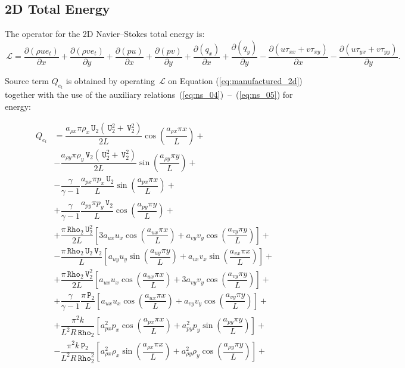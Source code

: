 \documentclass[10pt]{article}
\newcommand{\Diff}[2] {\dfrac{\partial( #1)}{\partial #2}}
\newcommand{\Rho}{\,\mathtt{Rho}}
\newcommand{\PP}{\,\mathtt{P}}
\newcommand{\U}{\,\mathtt{U}}
\newcommand{\V}{\,\mathtt{V}}
\newcommand{\Lo}{\,\mathcal{L}}
\begin{document}
\subsection{2D Total Energy}

The operator for the 2D Navier--Stokes total energy is:
\begin{equation*}
 \Lo=  \Diff{\rho ue_t }{x}+\Diff{\rho ve_t}{y}+\Diff{pu}{x} +\Diff{pv}{y}+\Diff{q_x}{x}+\Diff{q_y}{y}-\Diff{u\tau_{xx}+v\tau_{xy}}{x}-\Diff{u\tau_{yx}+v\tau_{yy}}{y}.
\end{equation*}


Source term $Q_{e_t}$ is obtained by operating $\Lo$ on Equation  (\ref{eq:manufactured_2d}) together with the use of the  auxiliary relations~(\ref{eq:ns_04})~--~(\ref{eq:ns_05}) for energy:

\begin{equation}
 \begin{split}\label{eq:source_e_2d}
Q_{e_t} &=\dfrac{ a_{\rho x} \pi \rho_x  \U_2 (\U_2^2+\V_2^2)}{2L}\cos\left(\dfrac{a_{\rho x} \pi x}{L}\right)+\\
&-\dfrac{ a_{\rho y} \pi \rho_y \V_2 (\U_2^2+\V_2^2) }{2L}\sin\left(\dfrac{a_{\rho y} \pi y}{L}\right) +\\
&-\dfrac{\gamma}{\gamma-1}\dfrac{a_{px} \pi p_x  \U_2}{L}\sin\left(\dfrac{a_{px} \pi x}{L}\right) +\\
&+  \dfrac{\gamma}{\gamma-1}\dfrac{a_{py}\pi p_y  \V_2}{L}\cos\left(\dfrac{a_{py} \pi y}{L}\right)+\\
&+ \dfrac{ \pi \Rho_2 \U_2^2}{2L}\left[3 a_{ux} u_x \cos\left(\dfrac{a_{ux} \pi x}{L}\right)+a_{vy} v_y \cos\left(\dfrac{a_{vy} \pi y}{L}\right)\right]+\\
&-\dfrac{\pi \Rho_2 \U_2 \V_2}{L}\left[a_{uy} u_y \sin\left(\dfrac{a_{uy} \pi y}{L}\right)+a_{vx}  v_x\sin\left(\dfrac{a_{vx} \pi x}{L}\right)\right] +\\
&+\dfrac{\pi \Rho_2 \V_2^2}{2L} \left[a_{ux} u_x \cos\left(\dfrac{a_{ux} \pi x}{L}\right)+3 a_{vy} v_y \cos\left(\dfrac{a_{vy} \pi y}{L}\right)\right] +\\
&+ \dfrac{\gamma}{\gamma-1}\dfrac{\pi \PP_2}{L}\left[a_{ux} u_x \cos\left(\dfrac{a_{ux} \pi x}{L}\right)+a_{vy} v_y \cos\left(\dfrac{a_{vy} \pi y}{L}\right)\right]+\\
&+\dfrac{ \pi^2 k}{L^2 R \Rho_2}\left[a_{px}^2 p_x \cos\left(\dfrac{a_{px} \pi x}{L}\right)+a_{py}^2 p_y \sin\left(\dfrac{a_{py} \pi y}{L}\right)\right] +\\
&-\dfrac{\pi^2 k \PP_2}{L^2 R \Rho_2^2}\left[a_{\rho x}^2 \rho_x \sin\left(\dfrac{a_{\rho x} \pi x}{L}\right)+a_{\rho y}^2 \rho_y \cos\left(\dfrac{a_{\rho y} \pi y}{L}\right)\right] +\\

\end{split}
\end{equation}
\end{document}
